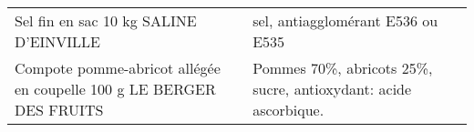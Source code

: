 \begin{longtable}{p{5cm}p{10cm}}
                                                                   Sel fin en sac 10 kg SALINE D'EINVILLE &                                                                                                                                                                                                                                                                                                                                                                                                                                                                                                                                                                                                                                                                                                                                                                                                                                                                                                                                                                                                        sel, antiagglomérant E536 ou E535 \\
                                     Compote pomme-abricot allégée en coupelle 100 g LE BERGER DES FRUITS &                                                                                                                                                                                                                                                                                                                                                                                                                                                                                                                                                                                                                                                                                                                                                                                                                                                                                                                                                                          Pommes 70\%, abricots 25\%, sucre, antioxydant: acide ascorbique. \\

\end{longtable}
